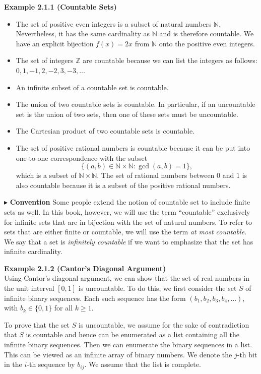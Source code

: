 \textbf{Example 2.1.1 (Countable Sets)} \\
\begin{itemize}
    \item The set of positive even integers is a subset of natural numbers $\mathbb{N}$. Nevertheless, it has the same cardinality as $\mathbb{N}$ and is therefore countable. We have an explicit bijection $f(x)=2x$ from $\mathbb{N}$ onto the positive even integers.
    \item The set of integers $\mathbb{Z}$ are countable because we can list the integers as follows: $0,1,-1,2,-2,3,-3,\ldots$
    \item An infinite subset of a countable set is countable.
    \item The union of two countable sets is countable. In particular, if an uncountable set is the union of two sets, then one of these sets must be uncountable.
    \item The Cartesian product of two countable sets is countable.
    \item The set of positive rational numbers is countable because it can be put into one-to-one correspondence with the subset
    \[
    \{(a,b)\in \mathbb{N}\times \mathbb{N} : \gcd(a,b)=1\},
    \]
    which is a subset of $\mathbb{N}\times \mathbb{N}$. The set of rational numbers between $0$ and $1$ is also countable because it is a subset of the positive rational numbers.
\end{itemize}

\noindent$\blacktriangleright$ \textbf{Convention} Some people extend the notion of countable set to include finite sets as well. In this book, however, we will use the term ``countable'' exclusively for infinite sets that are in bijection with the set of natural numbers. To refer to sets that are either finite or countable, we will use the term \textit{at most countable}. We say that a set is \textit{infinitely countable} if we want to emphasize that the set has infinite cardinality.

\textbf{Example 2.1.2 (Cantor's Diagonal Argument)} \\
Using Cantor's diagonal argument, we can show that the set of real numbers in the unit interval $[0,1]$ is uncountable. To do this, we first consider the set $S$ of infinite binary sequences. Each such sequence has the form $(b_1,b_2,b_3,b_4,\dots)$, with $b_k\in \{0,1\}$ for all $k\ge 1$.

To prove that the set $S$ is uncountable, we assume for the sake of contradiction that $S$ is countable and hence can be enumerated as a list containing all the infinite binary sequences. Then we can enumerate the binary sequences in a list. This can be viewed as an infinite array of binary numbers. We denote the $j$-th bit in the $i$-th sequence by $b_{ij}$. We assume that the list is complete.

